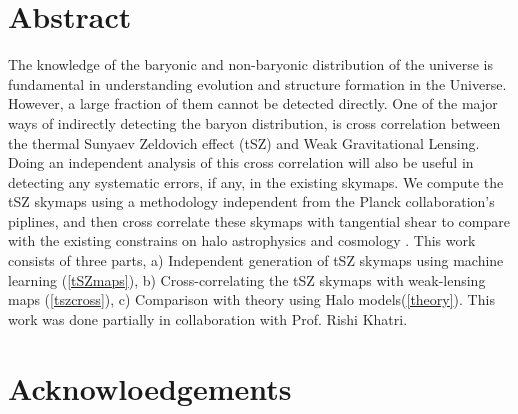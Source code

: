 \chapter*{Abstract}
The knowledge of the baryonic and non-baryonic distribution of the universe is
fundamental in understanding evolution and structure formation in the Universe.
However, a large fraction of them cannot be detected directly. One of the major
ways of indirectly detecting the baryon distribution, is cross correlation
between the thermal Sunyaev Zeldovich effect (tSZ) and Weak Gravitational Lensing.
Doing an independent analysis of this cross correlation will also be useful
in detecting any systematic errors, if any, in the existing skymaps.
We compute the tSZ skymaps using a methodology independent from the Planck collaboration's piplines,
and then cross correlate these skymaps with tangential shear to compare with the existing constrains
on halo astrophysics and cosmology \cite{tszrcscross}.
This work consists of three parts,
a) Independent generation of tSZ skymaps using machine learning (\ref{tSZmaps}),
b) Cross-correlating the tSZ skymaps with weak-lensing maps (\ref{tszcross}),
c) Comparison with theory using Halo models(\ref{theory}).
This work was done partially in collaboration with Prof. Rishi Khatri.

\chapter*{Acknowloedgements}
